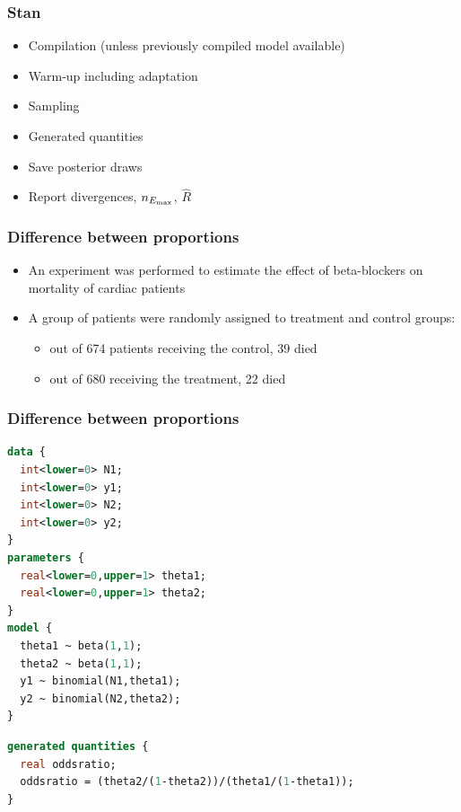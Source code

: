 \documentclass[10pt]{beamer}
\begin{document}
\begin{frame}

\frametitle{Stan}

  \begin{itemize}
  \item Compilation (unless previously compiled model available)
  \item Warm-up including adaptation
  \item Sampling
  \item Generated quantities
  \item Save posterior draws
  \item Report divergences, $n_{E_{\rm max}}$, $\widehat{R}$
  \end{itemize}

\end{frame}

\begin{frame}[fragile]

\frametitle{Difference between proportions}

\begin{itemize}
  \item An experiment was performed to estimate the effect of
    beta-blockers on mortality of cardiac patients
  \item A group of
    patients were randomly assigned to treatment and control groups:
    \begin{itemize}
    \item out of 674 patients receiving the control, 39 died
    \item out of 680 receiving the treatment, 22 died
    \end{itemize}
  \end{itemize}
\end{frame}

\begin{frame}[fragile]

\frametitle{Difference between proportions}


  {\small\color{gray}
    {
\begin{lstlisting}[language=Stan]
data {
  int<lower=0> N1;
  int<lower=0> y1;
  int<lower=0> N2;
  int<lower=0> y2;
}
parameters {
  real<lower=0,upper=1> theta1;
  real<lower=0,upper=1> theta2;
}
model {
  theta1 ~ beta(1,1);
  theta2 ~ beta(1,1);
  y1 ~ binomial(N1,theta1);
  y2 ~ binomial(N2,theta2);
}
\end{lstlisting}
    }
    {
\begin{lstlisting}[language=Stan]
generated quantities {
  real oddsratio;
  oddsratio = (theta2/(1-theta2))/(theta1/(1-theta1));
}
\end{lstlisting}
    }
  }
\end{frame}
\end{document}
